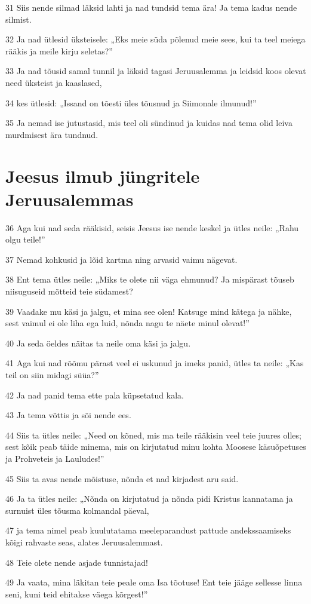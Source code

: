 \par 31 Siis nende silmad läksid lahti ja nad tundsid tema ära! Ja tema kadus nende silmist.
\par 32 Ja nad ütlesid üksteisele: „Eks meie süda põlenud meie sees, kui ta teel meiega rääkis ja meile kirju seletas?”
\par 33 Ja nad tõusid samal tunnil ja läksid tagasi Jeruusalemma ja leidsid koos olevat need üksteist ja kaaslased,
\par 34 kes ütlesid: „Issand on tõesti üles tõusnud ja Siimonale ilmunud!”
\par 35 Ja nemad ise jutustasid, mis teel oli sündinud ja kuidas nad tema olid leiva murdmisest ära tundnud.

\section*{Jeesus ilmub jüngritele Jeruusalemmas}

\par 36 Aga kui nad seda rääkisid, seisis Jeesus ise nende keskel ja ütles neile: „Rahu olgu teile!”
\par 37 Nemad kohkusid ja lõid kartma ning arvasid vaimu nägevat.
\par 38 Ent tema ütles neile: „Miks te olete nii väga ehmunud? Ja mispärast tõuseb niisuguseid mõtteid teie südamest?
\par 39 Vaadake mu käsi ja jalgu, et mina see olen! Katsuge mind kätega ja nähke, sest vaimul ei ole liha ega luid, nõnda nagu te näete minul olevat!”
\par 40 Ja seda öeldes näitas ta neile oma käsi ja jalgu.
\par 41 Aga kui nad rõõmu pärast veel ei uskunud ja imeks panid, ütles ta neile: „Kas teil on siin midagi süüa?”
\par 42 Ja nad panid tema ette pala küpsetatud kala.
\par 43 Ja tema võttis ja sõi nende ees.
\par 44 Siis ta ütles neile: „Need on kõned, mis ma teile rääkisin veel teie juures olles; sest kõik peab täide minema, mis on kirjutatud minu kohta Moosese käsuõpetuses ja Prohveteis ja Lauludes!”
\par 45 Siis ta avas nende mõistuse, nõnda et nad kirjadest aru said.
\par 46 Ja ta ütles neile: „Nõnda on kirjutatud ja nõnda pidi Kristus kannatama ja surnuist üles tõusma kolmandal päeval,
\par 47 ja tema nimel peab kuulutatama meeleparandust pattude andekssaamiseks kõigi rahvaste seas, alates Jeruusalemmast.
\par 48 Teie olete nende asjade tunnistajad!
\par 49 Ja vaata, mina läkitan teie peale oma Isa tõotuse! Ent teie jääge sellesse linna seni, kuni teid ehitakse väega kõrgest!”

